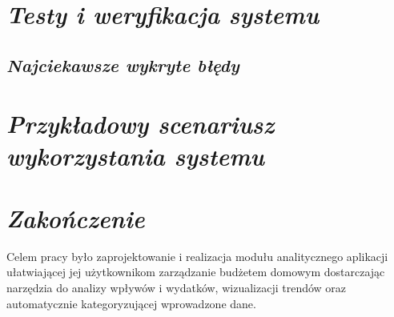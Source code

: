 \documentclass[a4paper,10pt, twoside]{report}
\newcommand{\customstylechapter}[1]{\large{\textit{#1}}}
\newcommand{\customstylesection}[1]{\textbf{\textit{#1}}}
\begin{document}
\begin{large}
\chapter{\customstylechapter{Testy i weryfikacja systemu}}
{}

\section{\customstylesection{Najciekawsze wykryte błędy}}
{}

\chapter{\customstylechapter{Przykładowy scenariusz wykorzystania systemu}}
{}

\chapter{\customstylechapter{Zakończenie}}
{Celem pracy było zaprojektowanie i realizacja modułu analitycznego aplikacji 
ułatwiającej jej użytkownikom zarządzanie budżetem domowym dostarczając 
narzędzia do analizy wpływów i wydatków, wizualizacji trendów oraz automatycznie 
kategoryzującej wprowadzone dane.}


\end{large}
\end{document}
